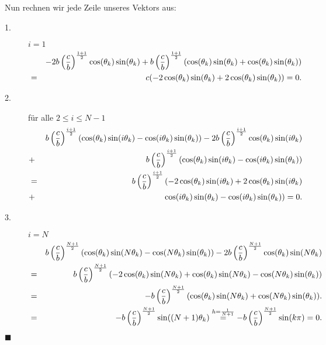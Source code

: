 Nun rechnen wir jede Zeile unseres Vektors aus:

\begin{description}
\item[1.] $i = 1$
\begin{eqnarray}
&& -2b\left(\frac{c}{b}\right)^{\frac{1+1}{2}} \cos(\theta_{k})\sin(\theta_{k}) + b \left(\frac{c}{b}\right)^{\frac{1+1}{2}} (\cos(\theta_{k}) \sin(\theta_{k}) + \cos(\theta_{k}) \sin(\theta_{k})) \notag \\
&=& c (-2\cos(\theta_{k})\sin(\theta_{k}) + 2\cos(\theta_{k})\sin(\theta_{k})) = 0. \notag
\end{eqnarray}
\item[2.] für alle $2 \le i \le N-1$
\begin{eqnarray}
&& b \left(\frac{c}{b}\right)^{\frac{i+1}{2}} (\cos(\theta_{k}) \sin(i \theta_{k}) - \cos(i \theta_{k}) \sin(\theta_{k})) - 2b\left(\frac{c}{b}\right)^{\frac{i+1}{2}} \cos(\theta_{k})\sin(i \theta_{k}) \notag \\
&+& b \left(\frac{c}{b}\right)^{\frac{i+1}{2}} (\cos(\theta_{k}) \sin(i \theta_{k}) - \cos(i \theta_{k}) \sin(\theta_{k})) \notag \\
&=& b \left(\frac{c}{b}\right)^{\frac{i+1}{2}} (-2\cos(\theta_{k})\sin(i\theta_{k}) + 2\cos(\theta_{k})\sin(i\theta_{k}) \notag \\
&+& \cos(i\theta_{k})\sin(\theta_{k}) - \cos(i\theta_{k})\sin(\theta_{k})) = 0. \notag
\end{eqnarray}
\item[3.] $i = N$
\begin{eqnarray}
&& b \left(\frac{c}{b}\right)^{\frac{N+1}{2}} (\cos(\theta_{k}) \sin(N \theta_{k}) - \cos(N \theta_{k}) \sin(\theta_{k})) - 2b\left(\frac{c}{b}\right)^{\frac{N+1}{2}} \cos(\theta_{k})\sin(N \theta_{k}) \notag \\
&=& b \left(\frac{c}{b}\right)^{\frac{N+1}{2}}(-2\cos(\theta_{k})\sin(N\theta_{k}) + \cos(\theta_{k})\sin(N\theta_{k}) - \cos(N\theta_{k})\sin(\theta_{k})) \notag \\
&=& -b \left(\frac{c}{b}\right)^{\frac{N+1}{2}}(\cos(\theta_{k})\sin(N\theta_{k}) + \cos(N\theta_{k})\sin(\theta_{k})). \notag \\
&=& -b \left(\frac{c}{b}\right)^{\frac{N+1}{2}} \sin((N+1)\theta_{k}) \overset{h = \frac{1}{N+1}}{=} -b \left(\frac{c}{b}\right)^{\frac{N+1}{2}} \sin(k\pi) = 0. \notag
\end{eqnarray}
\end{description}
\begin{flushright}
$\blacksquare$
\end{flushright}
